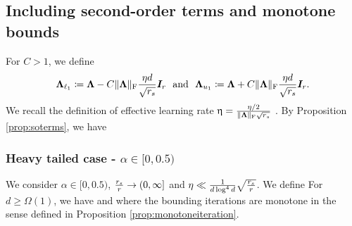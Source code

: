 \subsection{Including second-order terms and monotone bounds}
\label{sec:monotonesec}
For $C > 1$, we define
\begin{align} 
\boldsymbol{\Lambda}_{\ell_1}  \coloneqq  \boldsymbol{\Lambda} - C  \lVert\boldsymbol{\Lambda}\rVert_\mathrm{F}   \frac{\eta d}{\sqrt{r_s} } \boldsymbol{I}_r    ~~ \text{and} ~~   \boldsymbol{\Lambda}_{u_1}   \coloneqq  \boldsymbol{\Lambda} +  C \lVert\boldsymbol{\Lambda}\rVert_\mathrm{F}     \frac{\eta d}{\sqrt{r_s} }  \boldsymbol{I}_r.  \label{eq:Llfs} 
\end{align}
We recall the definition of effective learning rate  $\upeta =  \frac{\eta/2}{\lVert\boldsymbol{\Lambda}\rVert_\mathrm{F} \sqrt{r_s}}$ . 
By Proposition \ref{prop:soterms}, we have
 
\subsubsection{Heavy tailed case - $\alpha \in [0,0.5)$}
\begin{proposition}
\label{prop:boundforiterationsheavy}
We consider $\alpha \in [0,0.5)$,  $\frac{r_s}{r} \to (0,\infty]$  and   $\eta \ll  \tfrac{1}{d \log^4 d} \sqrt{\tfrac{r_s}{r}}$. We define
For  $d \geq \Omega(1)$,  we have   
and
where the bounding iterations  are monotone in the sense defined in Proposition \ref{prop:monotoneiteration}.
\end{proposition}


